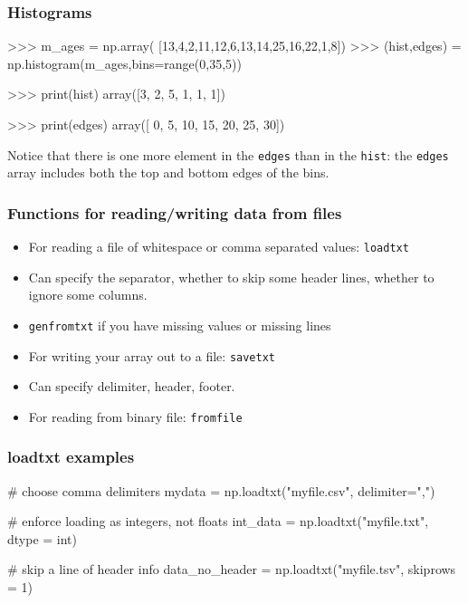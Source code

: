\documentclass{beamer}
\begin{document}
\begin{frame}[fragile]
\frametitle{Histograms}
\begin{code}
>>> m_ages = np.array(
      [13,4,2,11,12,6,13,14,25,16,22,1,8])
>>> (hist,edges) = np.histogram(m_ages,bins=range(0,35,5))

>>> print(hist)
array([3, 2, 5, 1, 1, 1])

>>> print(edges)
array([ 0,  5, 10, 15, 20, 25, 30])
\end{code}

Notice that there is one more element in the \texttt{edges} than in the \texttt{hist}: the \texttt{edges} array includes both the top and bottom edges of the bins.
\end{frame}


\begin{frame}[fragile]
\frametitle{Functions for reading/writing data from files}
\begin{itemize}
\item For reading a file of whitespace or comma separated values: \texttt{loadtxt}
\item Can specify the separator, whether to skip some header lines,
  whether to ignore some columns.
\item \texttt{genfromtxt} if you have missing values or missing lines
\item For writing your array out to a file: \texttt{savetxt}
\item Can specify delimiter, header, footer.
\item For reading from binary file: \texttt{fromfile}
\end{itemize}
\end{frame}

\begin{frame}[fragile]
\frametitle{loadtxt examples}
\begin{code}
# choose comma delimiters
mydata = np.loadtxt("myfile.csv", delimiter=",")

# enforce loading as integers, not floats
int_data = np.loadtxt("myfile.txt", dtype = int)

# skip a line of header info
data_no_header = np.loadtxt("myfile.tsv", skiprows = 1)
\end{code}
\end{frame}
\end{document}
